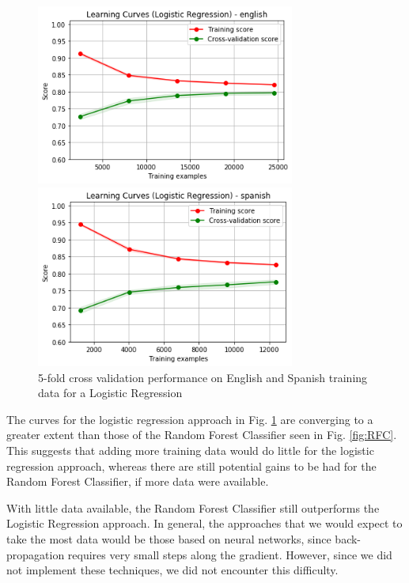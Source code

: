 \documentclass[11pt,a4paper]{article}
\begin{document}
\begin{figure}[h]
\begin{minipage}[b]{1.0\linewidth}
  \centering
  \centerline{\includegraphics[width=8.5cm]{images/LogEng}}
\end{minipage}
\begin{minipage}[b]{1.0\linewidth}
  \centering
  \centerline{\includegraphics[width=8.5cm]{images/LogSp}}
\end{minipage}
\caption{5-fold cross validation performance on English and Spanish training data for a Logistic Regression}
\label{fig:Log}
\end{figure}

The curves for the logistic regression approach in Fig. \ref{fig:Log} are converging to a greater extent than those of the Random Forest Classifier seen in Fig. \ref{fig:RFC}. This suggests that adding more training data would do little for the logistic regression approach, whereas there are still potential gains to be had for the Random Forest Classifier, if more data were available.

With little data available, the Random Forest Classifier still outperforms the Logistic Regression approach. In general, the approaches that we would expect to take the most data would be those based on neural networks, since back-propagation requires very small steps along the gradient. However, since we did not implement these techniques, we did not encounter this difficulty.
\end{document}
